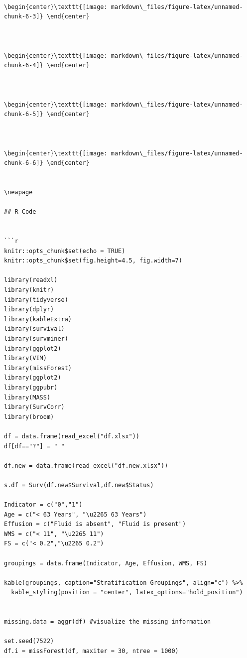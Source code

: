 \documentclass[
]{article}
\begin{document}
\begin{verbatim}



\begin{center}\texttt{[image: markdown\_files/figure-latex/unnamed-chunk-6-3]} \end{center}



\begin{center}\texttt{[image: markdown\_files/figure-latex/unnamed-chunk-6-4]} \end{center}



\begin{center}\texttt{[image: markdown\_files/figure-latex/unnamed-chunk-6-5]} \end{center}



\begin{center}\texttt{[image: markdown\_files/figure-latex/unnamed-chunk-6-6]} \end{center}


\newpage

## R Code


```r
knitr::opts_chunk$set(echo = TRUE)
knitr::opts_chunk$set(fig.height=4.5, fig.width=7)

library(readxl)
library(knitr)
library(tidyverse)
library(dplyr)
library(kableExtra)
library(survival)
library(survminer)
library(ggplot2)
library(VIM)
library(missForest)
library(ggplot2)
library(ggpubr)
library(MASS)
library(SurvCorr)
library(broom)

df = data.frame(read_excel("df.xlsx"))
df[df=="?"] = " "

df.new = data.frame(read_excel("df.new.xlsx"))

s.df = Surv(df.new$Survival,df.new$Status)

Indicator = c("0","1")
Age = c("< 63 Years", "\u2265 63 Years")
Effusion = c("Fluid is absent", "Fluid is present")
WMS = c("< 11", "\u2265 11")
FS = c("< 0.2","\u2265 0.2")

groupings = data.frame(Indicator, Age, Effusion, WMS, FS)

kable(groupings, caption="Stratification Groupings", align="c") %>%
  kable_styling(position = "center", latex_options="hold_position")


missing.data = aggr(df) #visualize the missing information

set.seed(7522) 
df.i = missForest(df, maxiter = 30, ntree = 1000)


\end{verbatim}
\end{document}
